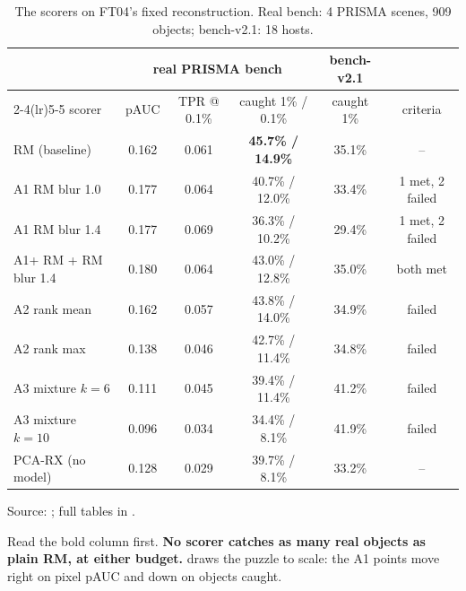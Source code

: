 \begin{table}[htbp]
\centering
\caption{The scorers on FT04's fixed reconstruction. Real bench: 4 PRISMA scenes, 909 objects; bench-v2.1: 18 hosts.}
\label{tab:scoringgains:results}
\small\setlength{\tabcolsep}{4pt}
\begin{tabular}{lccccc}
\toprule
 & \multicolumn{3}{c}{real PRISMA bench} & bench-v2.1 & \\
\cmidrule(lr){2-4}\cmidrule(lr){5-5}
scorer & pAUC & TPR @ 0.1\% & caught 1\% / 0.1\% & caught 1\% & criteria \\
\midrule
RM (baseline) & 0.162 & 0.061 & \textbf{45.7\% / 14.9\%} & 35.1\% & -- \\
A1 RM blur 1.0 & 0.177 & 0.064 & 40.7\% / 12.0\% & 33.4\% & 1 met, 2 failed \\
A1 RM blur 1.4 & 0.177 & 0.069 & 36.3\% / 10.2\% & 29.4\% & 1 met, 2 failed \\
A1+ RM + RM blur 1.4 & 0.180 & 0.064 & 43.0\% / 12.8\% & 35.0\% & both met \\
A2 rank mean & 0.162 & 0.057 & 43.8\% / 14.0\% & 34.9\% & failed \\
A2 rank max & 0.138 & 0.046 & 42.7\% / 11.4\% & 34.8\% & failed \\
A3 mixture $k = 6$ & 0.111 & 0.045 & 39.4\% / 11.4\% & 41.2\% & failed \\
A3 mixture $k = 10$ & 0.096 & 0.034 & 34.4\% / 8.1\% & 41.9\% & failed \\
PCA-RX (no model) & 0.128 & 0.029 & 39.7\% / 8.1\% & 33.2\% & -- \\
\bottomrule
\end{tabular}

\smallskip
{\footnotesize Source: ; full tables in .}
\end{table}

Read the bold column first. \textbf{No scorer catches as many real objects as plain RM, at either budget.}
 draws the puzzle to scale: the A1 points move right on pixel pAUC and down on objects
caught.

